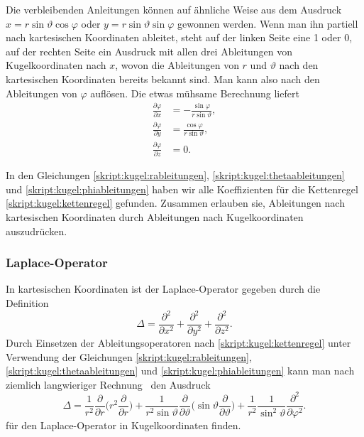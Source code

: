 Die verbleibenden Anleitungen können auf ähnliche Weise aus dem Ausdruck
$x=r\sin\vartheta\cos\varphi$
oder
$y=r\sin\vartheta\sin\varphi$
gewonnen werden.
Wenn man ihn partiell nach kartesischen Koordinaten ableitet,
steht auf der linken Seite eine 1 oder 0,
auf der rechten Seite ein Ausdruck mit allen drei Ableitungen von
Kugelkoordinaten nach $x$, wovon die Ableitungen von $r$ und $\vartheta$
nach den kartesischen Koordinaten bereits bekannt sind.
Man kann also nach den Ableitungen von $\varphi$ auflösen.
Die etwas mühsame Berechnung liefert
\begin{equation}
\begin{aligned}
\frac{\partial \varphi}{\partial x}
&=
-\frac{\sin\varphi}{r\sin\vartheta},
\\
\frac{\partial \varphi}{\partial y}
&=
\frac{\cos\varphi}{r\sin\vartheta},
\\
\frac{\partial \varphi}{\partial z}
&=
0.
\end{aligned}
\label{skript:kugel:phiableitungen}
\end{equation}

In den Gleichungen
\eqref{skript:kugel:rableitungen},
\eqref{skript:kugel:thetaableitungen}
und
\eqref{skript:kugel:phiableitungen}
haben wir alle Koeffizienten für die Kettenregel
\eqref{skript:kugel:kettenregel}
gefunden.
Zusammen erlauben sie, Ableitungen nach kartesischen Koordinaten
durch Ableitungen nach Kugelkoordinaten auszudrücken.

\subsubsection{Laplace-Operator}
In kartesischen Koordinaten ist der Laplace-Operator gegeben durch die
Definition
\[
\Delta
=
\frac{\partial^2}{\partial x^2}
+
\frac{\partial^2}{\partial y^2}
+
\frac{\partial^2}{\partial z^2}.
\]
Durch Einsetzen der Ableitungsoperatoren nach
\eqref{skript:kugel:kettenregel} unter Verwendung der Gleichungen
\eqref{skript:kugel:rableitungen},
\eqref{skript:kugel:thetaableitungen}
und
\eqref{skript:kugel:phiableitungen}
kann man nach ziemlich langwieriger
Rechnung~\cite[Anhang B.3]{skript:mathsem-qm}
den Ausdruck
\begin{equation}
\Delta
=
\frac1{r^2}\frac{\partial}{\partial r}
\biggl(r^2\frac{\partial}{\partial r}\biggr)
+
\frac{1}{r^2\sin\vartheta}\frac{\partial}{\partial\vartheta}
\biggl(\sin\vartheta\frac{\partial}{\partial\vartheta}\biggr)
+
\frac{1}{r^2}
\frac{1}{\sin^2\vartheta}
\frac{\partial^2}{\partial\varphi^2}.
\end{equation}
für den Laplace-Operator in Kugelkoordinaten finden.
%

